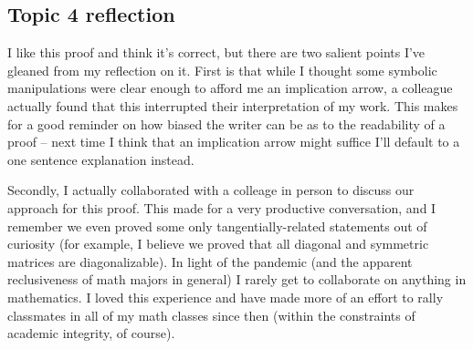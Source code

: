 \documentclass[11pt, letterpaper]{article}
\begin{document}
\subsection*{Topic 4 reflection}
I like this proof and think it's correct, but there are two salient points I've gleaned from my reflection on it.
First is that while I thought some symbolic manipulations were clear enough to afford me an implication arrow,
a colleague actually found that this interrupted their interpretation of my work. This makes for a good reminder on
how biased the writer can be as to the readability of a proof -- next time I think that an implication arrow
might suffice I'll default to a one sentence explanation instead.

Secondly, I actually collaborated with a colleage in person to discuss our approach for this proof. This
made for a very productive conversation, and I remember we even proved some only tangentially-related statements
out of curiosity (for example, I believe we proved that all diagonal and symmetric matrices are diagonalizable). 
In light of the pandemic (and the apparent reclusiveness of math majors in general) I rarely get to collaborate
on anything in mathematics. I loved this experience and have made more of an effort to rally classmates 
in all of my math classes since then (within the constraints of academic integrity, of course). 
\newpage
\end{document}
